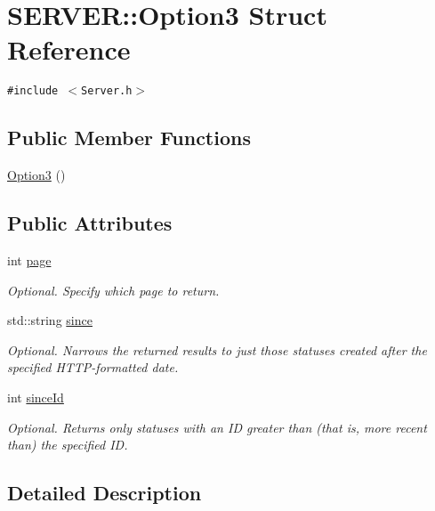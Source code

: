 \hypertarget{structSERVER_1_1Option3}{
\section{SERVER::Option3 Struct Reference}
\label{structSERVER_1_1Option3}
}
{\tt \#include $<$Server.h$>$}

\subsection*{Public Member Functions}
\begin{CompactItemize}
\item 
\hyperlink{structSERVER_1_1Option3_aa0c40ea1bb475515e5e810c05ce4dca}{Option3} ()
\end{CompactItemize}
\subsection*{Public Attributes}
\begin{CompactItemize}
\item 
int \hyperlink{structSERVER_1_1Option3_94f1d27b09f86c44d18275a3c3f2697d}{page}
\begin{CompactList}\small\item\em Optional. Specify which page to return. \item\end{CompactList}\item 
std::string \hyperlink{structSERVER_1_1Option3_f2d56b690d7b755c4ca88869dfcf9ff6}{since}
\begin{CompactList}\small\item\em Optional. Narrows the returned results to just those statuses created after the specified HTTP-formatted date. \item\end{CompactList}\item 
int \hyperlink{structSERVER_1_1Option3_7acbe4cffada84ed124186614322c162}{sinceId}
\begin{CompactList}\small\item\em Optional. Returns only statuses with an ID greater than (that is, more recent than) the specified ID. \item\end{CompactList}\end{CompactItemize}


\subsection{Detailed Description}


